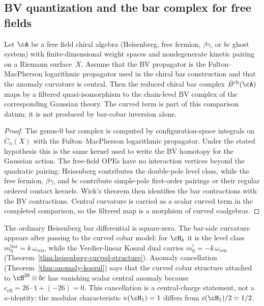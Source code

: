 \subsection{BV quantization and the bar complex for free fields}
\label{sec:bv-bar-free-fields}

\begin{proposition}
\label{prop:bar-bv-free-fields}
Let $\cA$ be a free field chiral algebra \textup{(}Heisenberg, free fermion,
$\beta\gamma$, or $bc$ ghost system\textup{)} with finite-dimensional
weight spaces and nondegenerate kinetic pairing on a Riemann surface~$X$.
Assume that the BV propagator is the Fulton--MacPherson logarithmic
propagator used in the chiral bar construction and that the anomaly
curvature is central. Then the reduced chiral bar complex
$\bar{B}^{\mathrm{ch}}(\cA)$ maps by a filtered quasi-isomorphism to
the chain-level BV complex of the corresponding Gaussian theory. The
curved term is part of this comparison datum; it is not produced by
bar-cobar inversion alone.
\end{proposition}

\begin{proof}
The genus-$0$ bar complex is computed by configuration-space
integrals on $\overline{C}_n(X)$ with the Fulton--MacPherson
logarithmic propagator. Under the stated hypothesis this is the same
kernel used to write the BV homotopy for the Gaussian action. The
free-field OPEs have no interaction vertices beyond the quadratic
pairing: Heisenberg contributes the double-pole level class, while
the free fermion, $\beta\gamma$, and $bc$ contribute simple-pole
first-order pairings or their regular ordered contact kernels. Wick's
theorem then identifies the bar contractions with the BV contractions.
Central curvature is carried as a scalar curved term in the completed
comparison, so the filtered map is a morphism of curved coalgebras.
\end{proof}

\begin{remark}
\label{rem:curvature-one-loop}
The ordinary Heisenberg bar differential is square-zero. The
bar-side curvature appears after passing to the curved cobar model:
for $\cH_k$ it is the level class
$m_0^{\mathrm{bar}}=k\,\omega_{\mathrm{cen}}$, while the
Verdier-linear Koszul dual carries
$m_0^!=-k\,\omega_{\mathrm{cen}}$
(Theorem~\ref{thm:heisenberg-curved-structure}). Anomaly
cancellation (Theorem~\ref{thm:anomaly-koszul}) says that the
curved cobar structure attached to $\cH^{26}\otimes bc$ has vanishing
scalar central anomaly because
$c_{\mathrm{eff}}=26\cdot 1+(-26)=0$. This cancellation is a
central-charge statement, not a $\kappa$-identity: the modular
characteristic $\kappa(\cH_1)=1$ differs from $c(\cH_1)/2=1/2$.
\end{remark}



